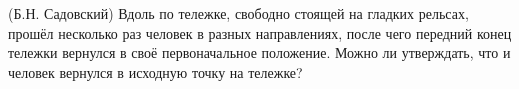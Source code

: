 (Б.Н. Садовский)
Вдоль по тележке, свободно стоящей на гладких рельсах, прошёл несколько
раз человек в разных направлениях, после чего передний конец
тележки вернулся в своё первоначальное положение. Можно ли утверждать,
что и человек вернулся в исходную точку на тележке?
